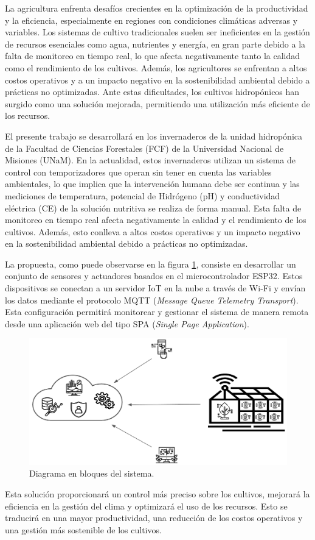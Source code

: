 La agricultura enfrenta desafíos crecientes en la optimización de la
productividad y la eficiencia, especialmente en regiones con condiciones
climáticas adversas y variables. Los sistemas de cultivo tradicionales suelen
ser ineficientes en la gestión de recursos esenciales como agua, nutrientes y
energía, en gran parte debido a la falta de monitoreo en tiempo real, lo que
afecta negativamente tanto la calidad como el rendimiento de los cultivos.
Además, los agricultores se enfrentan a altos costos operativos y a un impacto
negativo en la sostenibilidad ambiental debido a prácticas no optimizadas. Ante
estas dificultades, los cultivos hidropónicos han surgido como una solución
mejorada, permitiendo una utilización más eficiente de los recursos.

El presente trabajo se desarrollará en los invernaderos de la unidad hidropónica de la Facultad de 
Ciencias Forestales (FCF) de la Universidad Nacional de Misiones (UNaM).
En la actualidad, estos invernaderos utilizan un sistema de control con temporizadores que 
operan sin tener en cuenta las variables ambientales, lo que implica que la intervención 
humana debe ser continua y las mediciones de temperatura, potencial de Hidrógeno (pH) y
conductividad eléctrica (CE) de la solución nutritiva se realiza de forma manual. Esta falta 
de monitoreo en tiempo real afecta negativamente la calidad y el rendimiento de los cultivos. 
Además, esto conlleva a altos costos operativos y un impacto negativo en la sostenibilidad  
ambiental debido a prácticas no optimizadas.

La propuesta, como puede observarse en la figura \ref{fig:diagBloques}, consiste
en desarrollar un conjunto de sensores y actuadores basados en el microcontrolador ESP32. Estos dispositivos 
se conectan a un servidor IoT en la nube a través de Wi-Fi y envían los datos mediante el protocolo MQTT 
(\textit{Message Queue Telemetry Transport}). Esta configuración permitirá monitorear y gestionar el sistema 
de manera remota desde una aplicación web del tipo SPA (\textit{Single Page Application}).


\begin{figure}[htpb]
	\centering
	\includegraphics[width=.85\textwidth]{./Figuras/figura1.png}
	\caption{Diagrama en bloques del sistema.}
	\label{fig:diagBloques}
\end{figure}

Esta solución proporcionará un control más preciso sobre los cultivos, mejorará la eficiencia en la gestión del 
clima y optimizará el uso de los recursos. Esto se traducirá en una mayor productividad, una reducción de los  
costos operativos y una gestión más sostenible de los cultivos.